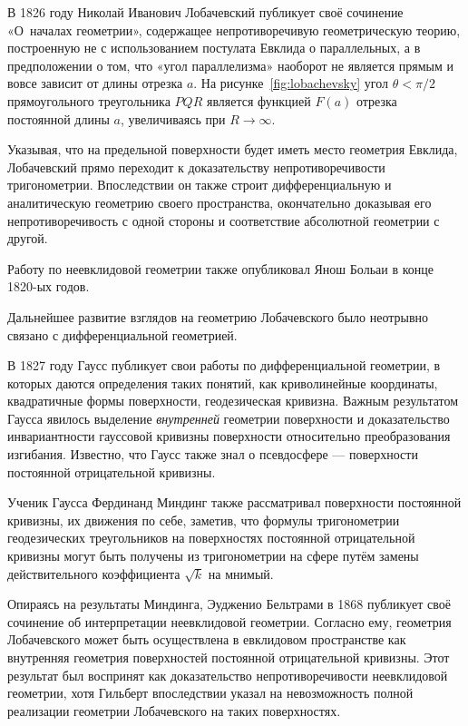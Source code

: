 \documentclass{article}
\numberwithin{equation}{section}
\begin{document}
В 1826 году Николай Иванович Лобачевский публикует своё сочинение
«О началах геометрии», содержащее непротиворечивую геометрическую
теорию, построенную не с использованием постулата Евклида о
параллельных, а в предположении о том, что «угол параллелизма»
наоборот не является прямым и вовсе зависит от длины отрезка $a$. На
рисунке \ref{fig:lobachevsky} угол $\theta < \pi/2$ прямоугольного
треугольника $PQR$ является функцией $F(a)$ отрезка постоянной длины
$a$, увеличиваясь при $R \to \infty$.



Указывая, что на предельной поверхности будет иметь место геометрия
Евклида, Лобачевский прямо переходит к доказательству
непротиворечивости тригонометрии. Впоследствии он также строит
дифференциальную и аналитическую геометрию своего пространства,
окончательно доказывая его непротиворечивость с одной стороны и
соответствие абсолютной геометрии с другой.

Работу по неевклидовой геометрии также опубликовал Янош Больаи в конце
1820-ых годов.

Дальнейшее развитие взглядов на геометрию Лобачевского было неотрывно
связано с дифференциальной геометрией.

В 1827 году Гаусс публикует свои работы по дифференциальной геометрии,
в которых даются определения таких понятий, как криволинейные
координаты, квадратичные формы поверхности, геодезическая кривизна.
Важным результатом Гаусса явилось выделение \emph{внутренней}
геометрии поверхности и доказательство инвариантности гауссовой
кривизны поверхности относительно преобразования изгибания. Известно,
что Гаусс также знал о псевдосфере — поверхности постоянной
отрицательной кривизны.

Ученик Гаусса Фердинанд Миндинг также рассматривал поверхности
постоянной кривизны, их движения по себе, заметив, что формулы
тригонометрии геодезических треугольников на поверхностях постоянной
отрицательной кривизны могут быть получены из тригонометрии на сфере
путём замены действительного коэффициента $\sqrt{k}$ на мнимый.

Опираясь на результаты Миндинга, Эудженио Бельтрами в 1868 публикует
своё сочинение об интерпретации неевклидовой геометрии. Согласно ему,
геометрия Лобачевского может быть осуществлена в евклидовом
пространстве как внутренняя геометрия поверхностей постоянной
отрицательной кривизны. Этот результат был воспринят как
доказательство непротиворечивости неевклидовой геометрии, хотя
Гильберт впоследствии указал на невозможность полной реализации
геометрии Лобачевского на таких поверхностях.
\end{document}
